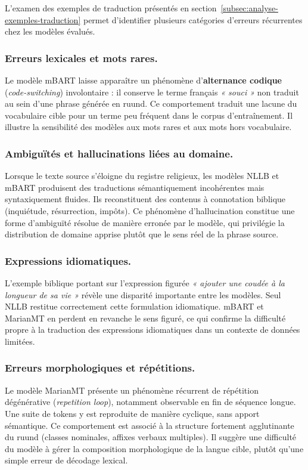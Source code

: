 L'examen des exemples de traduction présentés en section~\ref{subsec:analyse-exemples-traduction} permet d'identifier plusieurs catégories d'erreurs récurrentes chez les modèles évalués.

\subsubsection{Erreurs lexicales et mots rares.}
Le modèle \ac{mBART} laisse apparaître un phénomène d'\textbf{alternance codique} (\textit{code-switching}) involontaire : il conserve le terme français \textit{« souci »} non traduit au sein d'une phrase générée en ruund. Ce comportement traduit une lacune du vocabulaire cible pour un terme peu fréquent dans le corpus d'entraînement. Il illustre la sensibilité des modèles aux mots rares et aux mots hors vocabulaire.

\subsubsection{Ambiguïtés et hallucinations liées au domaine.}
Lorsque le texte source s'éloigne du registre religieux, les modèles \ac{NLLB} et \ac{mBART} produisent des traductions sémantiquement incohérentes mais syntaxiquement fluides. Ils reconstituent des contenus à connotation biblique (inquiétude, résurrection, impôts). Ce phénomène d'hallucination constitue une forme d'ambiguïté résolue de manière erronée par le modèle, qui privilégie la distribution de domaine apprise plutôt que le sens réel de la phrase source.

\subsubsection{Expressions idiomatiques.}
L'exemple biblique portant sur l'expression figurée \textit{« ajouter une coudée à la longueur de sa vie »} révèle une disparité importante entre les modèles. Seul \ac{NLLB} restitue correctement cette formulation idiomatique. \ac{mBART} et \ac{MarianMT} en perdent en revanche le sens figuré, ce qui confirme la difficulté propre à la traduction des expressions idiomatiques dans un contexte de données limitées.

\subsubsection{Erreurs morphologiques et répétitions.}
Le modèle \ac{MarianMT} présente un phénomène récurrent de répétition dégénérative (\textit{repetition loop}), notamment observable en fin de séquence longue. Une suite de tokens y est reproduite de manière cyclique, sans apport sémantique. Ce comportement est associé à la structure fortement agglutinante du ruund (classes nominales, affixes verbaux multiples). Il suggère une difficulté du modèle à gérer la composition morphologique de la langue cible, plutôt qu'une simple erreur de décodage lexical.

